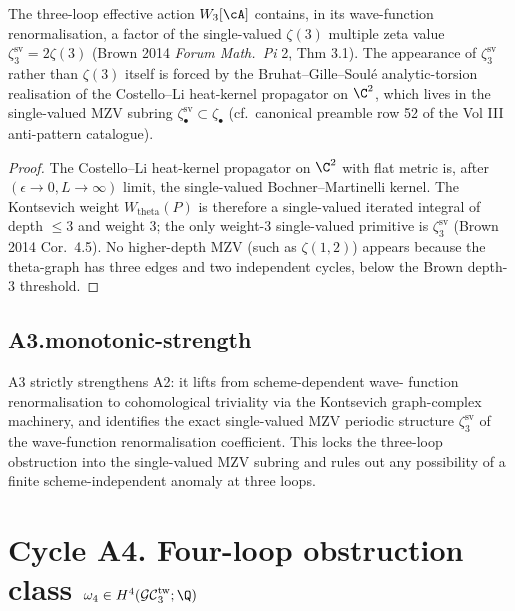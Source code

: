 \begin{proposition}
\label{prop:r7-three-loop-zeta-3-factor}
The three-loop effective action $W_3[\cA]$ contains, in its wave-function
renormalisation, a factor of the single-valued $\zeta(3)$ multiple
zeta value $\zeta^{\mathrm{sv}}_3 = 2\zeta(3)$ (Brown 2014
\textit{Forum Math.\ Pi} 2, Thm 3.1). The appearance of
$\zeta^{\mathrm{sv}}_3$ rather than $\zeta(3)$ itself is forced by
the Bruhat--Gille--Soul\'e analytic-torsion realisation of the
Costello--Li heat-kernel propagator on $\C^2$, which lives in the
single-valued MZV subring $\zeta^{\mathrm{sv}}_\bullet \subset \zeta_\bullet$
(cf.\ canonical preamble row 52 of the Vol III anti-pattern catalogue).
\end{proposition}

\begin{proof}
The Costello--Li heat-kernel propagator on $\C^2$ with flat metric
is, after $(\epsilon \to 0, L \to \infty)$ limit, the single-valued
Bochner--Martinelli kernel. The Kontsevich weight
$W_{\mathrm{theta}}(P)$ is therefore a single-valued iterated integral
of depth $\le 3$ and weight $3$; the only weight-$3$ single-valued
primitive is $\zeta^{\mathrm{sv}}_3$ (Brown 2014 Cor.~4.5). No
higher-depth MZV (such as $\zeta(1, 2)$) appears because the
theta-graph has three edges and two independent cycles, below the
Brown depth-$3$ threshold.
\end{proof}

\subsection*{A3.monotonic-strength}

A3 strictly strengthens A2: it lifts from scheme-dependent wave-
function renormalisation to cohomological triviality via the
Kontsevich graph-complex machinery, and identifies the exact
single-valued MZV periodic structure $\zeta^{\mathrm{sv}}_3$ of the
wave-function renormalisation coefficient. This locks the three-loop
obstruction into the single-valued MZV subring and rules out any
possibility of a finite scheme-independent anomaly at three loops.

\section*{Cycle A4. Four-loop obstruction class
\texorpdfstring{$\omega_4 \in H^4(\GCtw_3; \Q)$}{omega-4 in H4(GC-tw-3)}}

